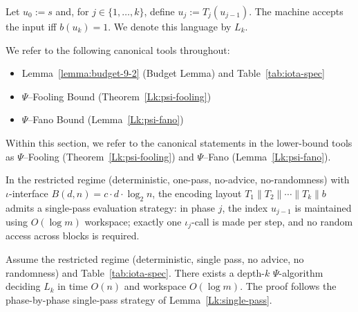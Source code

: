 \begin{definition}[Language $L_k$]
Let $u_0 := s$ and, for $j\in\{1,\ldots,k\}$, define $u_j := T_j(u_{j-1})$. The machine accepts the input iff $b(u_k)=1$. We denote this language by $L_k$.
\end{definition}

\begin{remark}
We refer to the following canonical tools throughout:
\begin{itemize}
  \item Lemma~\ref{lemma:budget-9-2} (Budget Lemma) and Table~\ref{tab:iota-spec}
  \item $\Psi$--Fooling Bound (Theorem~\ref{Lk:psi-fooling})
  \item $\Psi$--Fano Bound (Lemma~\ref{Lk:psi-fano})
\end{itemize}
\end{remark}


\begin{remark}\label{Lk:aliases}
Within this section, we refer to the canonical statements in the lower-bound tools as $\Psi$--Fooling (Theorem~\ref{Lk:psi-fooling}) and $\Psi$--Fano (Lemma~\ref{Lk:psi-fano}).
\end{remark}

\begin{lemma}\label{Lk:single-pass}
In the restricted regime (deterministic, one-pass, no-advice, no-randomness) with $\iota$-interface $B(d,n)=c \cdot d \cdot \log_{2} n$, the encoding layout $\ensuremath{T_1\parallel T_2\parallel\cdots\parallel T_k\parallel b}$ admits a single-pass evaluation strategy: in phase $j$, the index $u_{j-1}$ is maintained using $O(\log m)$ workspace; exactly one $\iota_j$-call is made per step, and no random access across blocks is required.
\end{lemma}

\begin{theorem}[UB at depth $k$]\label{Lk:ub-main}
Assume the restricted regime (deterministic, single pass, no advice, no randomness) and Table~\ref{tab:iota-spec}. There exists a depth-$k$ $\Psi$-algorithm deciding $L_k$ in time $O(n)$ and workspace $O(\log m)$. The proof follows the phase-by-phase single-pass strategy of Lemma~\ref{Lk:single-pass}.
\end{theorem}

